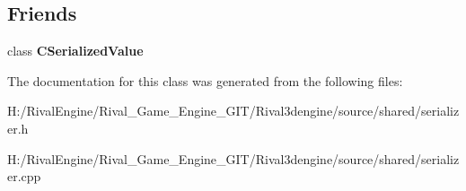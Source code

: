 \subsection*{Friends}
\begin{DoxyCompactItemize}
\item 
\mbox{\label{class_c_serializer_a4ca4672f09c538a3eb58046d8a58bbf8}} 
class {\bfseries C\+Serialized\+Value}
\end{DoxyCompactItemize}


The documentation for this class was generated from the following files\+:\begin{DoxyCompactItemize}
\item 
H\+:/\+Rival\+Engine/\+Rival\+\_\+\+Game\+\_\+\+Engine\+\_\+\+G\+I\+T/\+Rival3dengine/source/shared/serializer.\+h\item 
H\+:/\+Rival\+Engine/\+Rival\+\_\+\+Game\+\_\+\+Engine\+\_\+\+G\+I\+T/\+Rival3dengine/source/shared/serializer.\+cpp\end{DoxyCompactItemize}
